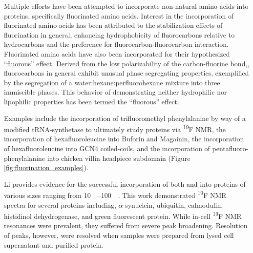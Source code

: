\begin{refsection}
Multiple efforts have been attempted to incorporate non-natural amino acids into
proteins, specifically fluorinated amino
acids.\cite{Meng2007,Lee2004,Son2006,Li2010a,Woll2006} Interest in the
incorporation of fluorinated amino acids has been attributed to the
stabilization effects of fluorination in general, enhancing hydrophobicity of
fluorocarbons relative to hydrocarbons and the preference for
fluorocarbon-fluorocarbon
interaction.\cite{Woll2006,Lee2004,Marsh2009,Jackel2006,Yoder2002} Fluorinated
amino acids have also been incorporated for their hypothesized ``fluorous''
effect. Derived from the low polarizability of the carbon-fluorine
bond,\cite{Scott1948}, fluorocarbons in general exhibit unusual phase
segregating properties, exemplified by the segregation of a
water:hexane:perfluorohexane mixture into three immiscible phases. This behavior
of demonstrating neither hydrophilic nor lipophilic properties has been termed
the ``fluorous'' effect.

Examples include the incorporation of trifluoromethyl phenylalanine by way of a
modified tRNA-synthetase to ultimately study  proteins via
\textsuperscript{19}F NMR,\cite{Li2010a,Jackson2007} the incorporation of
hexafluoroleucine into Buforin and Magainin,\cite{Meng2007} the incorporation of
hexafluoroleucine into GCN4 coiled-coils,\cite{Lee2004} and the incorporation of
pentafluoro-phenylalanine into chicken villin headpiece subdomain\cite{Woll2006}
(Figure \ref{fig:fluorination_examples}).

Li provides evidence for the successful incorporation of both
 and  into
proteins of various sizes ranging from
\SIrange{10}{100}{\kilo\Da}.\cite{Li2010b} This work demonstrated
\textsuperscript{19}F NMR spectra for several proteins including,
${\alpha}$-synuclein, ubiquitin, calmodulin, histidinol dehydrogenase, and green
fluorescent protein. While in-cell \textsuperscript{19}F NMR resonances were
prevalent, they suffered from severe peak broadening. Resolution of peaks,
however, were resolved when samples were prepared from lysed cell supernatant
and purified protein.


\end{refsection}

